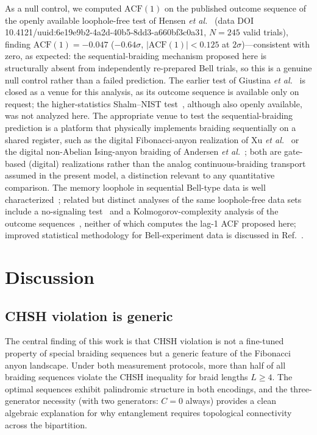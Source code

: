 \documentclass[aps,pra,twocolumn,superscriptaddress,longbibliography,floatfix,nofootinbib]{revtex4-2}
\begin{document}
As a null control, we computed $\text{ACF}(1)$ on the published
outcome sequence of the openly available loophole-free test of Hensen
\emph{et al.}~\cite{Hensen2015} (data DOI
10.4121/uuid:6e19e9b2-4a2d-40b5-8dd3-a660bf3c0a31, $N=245$ valid
trials), finding
$\text{ACF}(1)=-0.047$ ($-0.64\sigma$, $|\text{ACF}(1)|<0.125$ at
$2\sigma$)---consistent with zero, as expected: the sequential-braiding
mechanism proposed here is structurally absent from independently
re-prepared Bell trials, so this is a genuine null control rather
than a failed prediction. The earlier test of Giustina \emph{et
al.}~\cite{Giustina2015} is closed as a venue for this analysis, as
its outcome sequence is available only on request; the higher-statistics
Shalm--NIST test~\cite{Shalm2015}, although also openly available, was
not analyzed here.
The appropriate venue to test the sequential-braiding prediction is
a platform that physically implements braiding sequentially on a
shared register, such as the digital Fibonacci-anyon realization of
Xu \emph{et al.}~\cite{XuEtAl2024} or the digital non-Abelian
Ising-anyon braiding of Andersen \emph{et al.}~\cite{Google2023};
both are gate-based (digital) realizations rather than the analog
continuous-braiding transport assumed in the present model, a
distinction relevant to any quantitative comparison.
The memory loophole in sequential Bell-type
data is well
characterized~\cite{BarrettCollinsHardyKentPopescu2002}; related but
distinct analyses of the same loophole-free data sets include a
no-signaling test~\cite{AdenierKhrennikov2017} and a
Kolmogorov-complexity analysis of the outcome
sequences~\cite{KovalskyHniloAguero2018,KovalskyHniloAguero2018b},
neither of which computes the lag-1 ACF proposed here; improved
statistical methodology for Bell-experiment data is discussed in
Ref.~\cite{Gill2022}.

\section{Discussion}
\label{sec:discussion}

\subsection{CHSH violation is generic}

The central finding of this work is that CHSH violation is not a
fine-tuned property of special braiding sequences but a generic
feature of the Fibonacci anyon landscape.
Under both measurement protocols, more than half of all braiding
sequences violate the CHSH inequality for braid lengths $L\geq 4$.
The optimal sequences exhibit palindromic structure in both encodings,
and the three-generator necessity (with two generators: $C=0$ always)
provides a clean algebraic explanation for why entanglement requires
topological connectivity across the bipartition.
\end{document}
